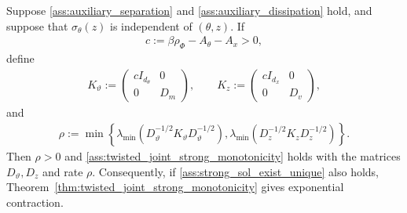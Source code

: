 \begin{corollary}
\label{cor:projected_strong_convexity}
Suppose \ref{ass:auxiliary_separation} and
\ref{ass:auxiliary_dissipation} hold, and suppose that
$\sigma_\theta(z)$ is independent of $(\theta,z)$.  If
\begin{align*}
c:=\beta\rho_\Phi-A_\theta-A_x>0,
\end{align*}
define
\begin{align*}
K_\vartheta:=
\begin{pmatrix}
cI_{d_\theta}&0\\
0&D_m
\end{pmatrix},
\qquad
K_z:=
\begin{pmatrix}
cI_{d_x}&0\\
0&D_v
\end{pmatrix},
\end{align*}
and
\begin{align*}
\rho:=
\min\left\{
\lambda_{\min}\!\left(
D_\vartheta^{-1/2}K_\vartheta D_\vartheta^{-1/2}
\right),
\lambda_{\min}\!\left(
D_z^{-1/2}K_zD_z^{-1/2}
\right)
\right\}.
\end{align*}
Then $\rho>0$ and
\ref{ass:twisted_joint_strong_monotonicity} holds with the
matrices $D_\vartheta,D_z$ and rate $\rho$.  Consequently, if
\ref{ass:strong_sol_exist_unique} also holds,
Theorem~\ref{thm:twisted_joint_strong_monotonicity} gives exponential
contraction.
\end{corollary}

